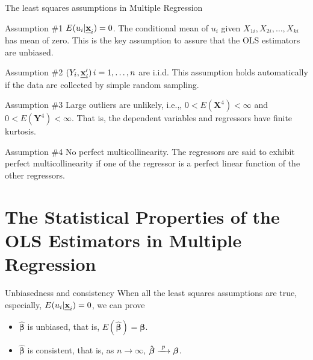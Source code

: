 \documentclass[presentation,10pt]{beamer}
\newcommand{\rarrowd}[1]{\xrightarrow{\text{ \textit #1 }}}
\def\mathbi#1{\textbf{\em #1}}
\begin{document}
\begin{frame}[label={sec:orgf387e60}]{The least squares assumptions in Multiple Regression}
\begin{block}{Assumption \#1}
\(E(u_i | \mathbi{x}_i) = 0\). The conditional mean
of \(u_i\) given \(X_{1i}, X_{2i}, \ldots, X_{ki}\) has
mean of zero. This is the key assumption to assure
that the OLS estimators are unbiased.
\end{block}

\begin{block}{Assumption \#2}
\((Y_i, \mathbi{x}_i^{\prime})\, i=1, \ldots, n\) are
i.i.d. This assumption holds automatically if the
data are collected by simple random sampling.
\end{block}

\begin{block}{Assumption \#3}
Large outliers are unlikely, i.e.,, \(0 <
E(\mathbf{X}^4) < \infty\) and \(0 < E(\mathbf{Y}^4)
< \infty\). That is, the dependent variables and
regressors have finite kurtosis.
\end{block}

\begin{block}{Assumption \#4}
No \alert{perfect multicollinearity}. The regressors are said to exhibit
perfect multicollinearity if one of the regressor is a perfect linear
function of the other regressors.
\end{block}
\end{frame}


\section{The Statistical Properties of the OLS Estimators in Multiple Regression}
\label{sec:orgdde0aa5}
\setcounter{tocdepth}{1}
\tableofcontents[currentsection]

\begin{frame}[label={sec:orgdb786b0}]{Unbiasedness and consistency}
When all the least squares assumptions are true, especially, \(E(u_i |
\mathbi{x}_i) = 0\), we can prove 

\begin{itemize}
\item \(\hat{\boldsymbol{\beta}}\) is unbiased, that is,
\(E(\hat{\boldsymbol{\beta}}) = \boldsymbol{\beta}\).

\item \(\hat{\boldsymbol{\beta}}\) is consistent, that is, as \(n \rightarrow
  \infty\), \(\hat{\boldsymbol{\beta}} \rarrowd{p} \boldsymbol{\beta}\).
\end{itemize}
\end{frame}
\end{document}
